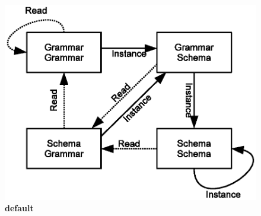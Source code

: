 \documentclass[11pt]{amsart}
\begin{document}
\begin{figure}[htbp]
\begin{center}
\includegraphics[scale=0.8]{QuadModel.eps}
\caption{{\bf default}}
\label{default}
\end{center}
\end{figure}
\end{document}
